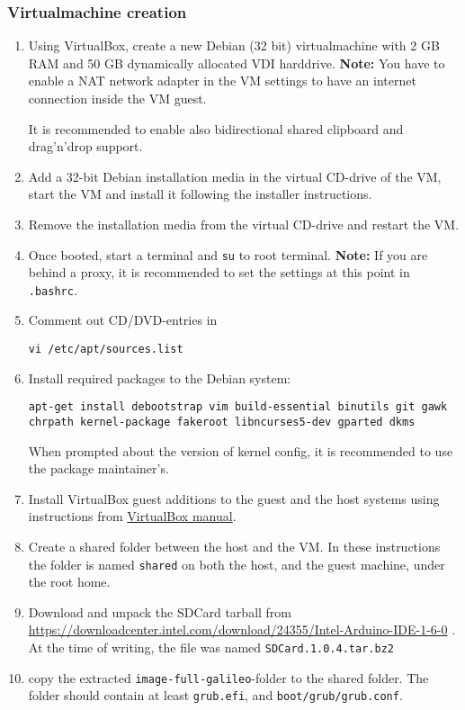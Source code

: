\documentclass[a4paper,11pt]{article}
\newcommand{\note}{\textbf{Note: }}
\newcommand{\cmd}[1]{\texttt{#1}}
\begin{document}
\subsubsection*{Virtualmachine creation}
\begin{enumerate}
\item Using VirtualBox, create a new Debian (32 bit) virtualmachine with 2 GB RAM and 50 GB dynamically allocated VDI harddrive. \note You have to enable a NAT network adapter in the VM settings to have an internet connection inside the VM guest. 

It is recommended to enable also bidirectional shared clipboard and drag'n'drop support.

\item Add a 32-bit Debian installation media in the virtual CD-drive of the VM, start the VM and install it following the installer instructions.

\item Remove the installation media from the virtual CD-drive and restart the VM.

\item Once booted, start a terminal and \cmd{su} to root terminal. \note If you are behind a proxy, it is recommended to set the settings at this point in \cmd{.bashrc}.

\item Comment out CD/DVD-entries in 
\begin{lstlisting}
vi /etc/apt/sources.list
\end{lstlisting}

\item Install required packages to the Debian system: 
\begin{lstlisting}
apt-get install debootstrap vim build-essential binutils git gawk chrpath kernel-package fakeroot libncurses5-dev gparted dkms
\end{lstlisting}

When prompted about the version of kernel config, it is recommended to use the package maintainer's.

\item Install VirtualBox guest additions to the guest and the host systems using instructions from \href{https://www.virtualbox.org/manual/ch04.html}{VirtualBox manual}.

\item Create a shared folder between the host and the VM. In these instructions the folder is named \cmd{shared} on both the host, and the guest machine, under the root home.

\item Download and unpack the SDCard tarball from \url{https://downloadcenter.intel.com/download/24355/Intel-Arduino-IDE-1-6-0} . At the time of writing, the file was named \cmd{SDCard.1.0.4.tar.bz2}

\item copy the extracted \cmd{image-full-galileo}-folder to the shared folder. The folder should contain at least \cmd{grub.efi}, and \cmd{boot/grub/grub.conf}.
\end{enumerate}
\end{document}
